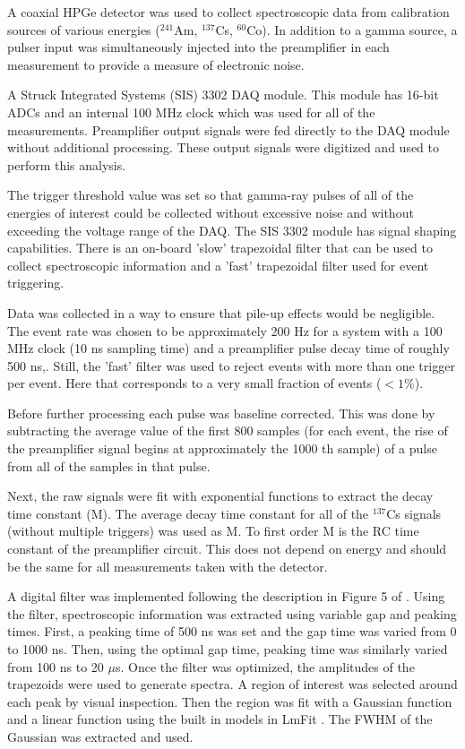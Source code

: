 A coaxial HPGe detector was used to collect spectroscopic data from calibration sources of various energies (${}^{241}$Am, ${}^{137}$Cs, ${}^{60}$Co). In addition to a gamma source, a pulser input was simultaneously injected into the preamplifier in each measurement to provide a measure of electronic noise. 

A Struck Integrated Systems (SIS) 3302 DAQ module. This module has 16-bit ADCs and an internal 100 MHz clock which was used for all of the measurements. Preamplifier output signals were fed directly to the DAQ module without additional processing. These output signals were digitized and used to perform this analysis.

The trigger threshold value was set so that gamma-ray pulses of all of the energies of interest could be collected without excessive noise and without exceeding the voltage range of the DAQ. The SIS 3302 module has signal shaping capabilities. There is an on-board 'slow' trapezoidal filter that can be used to collect spectroscopic information and a 'fast' trapezoidal filter used for event triggering. 

Data was collected in a way to ensure that pile-up effects would be negligible. The event rate was chosen to be approximately 200 Hz for a system with a 100 MHz clock (10 ns sampling time) and a preamplifier pulse decay time of roughly 500 ns,. Still, the 'fast' filter was used to reject events with more than one trigger per event. Here that corresponds to a very small fraction of events ($<1\%$). 

Before further processing each pulse was baseline corrected. This was done by subtracting the average value of the first 800 samples (for each event, the rise of the preamplifier signal begins at approximately the 1000 th sample) of a pulse from all of the samples in that pulse.

Next, the raw signals were fit with exponential functions to extract the decay time constant (M). The average decay time constant for all of the ${}^{137}$Cs signals (without multiple triggers) was used as M. To first order M is the RC time constant of the preamplifier circuit. This does not depend on energy and should be the same for all measurements taken with the detector.

A digital filter was implemented following the description in Figure 5 of \cite{Jordanov}. Using the filter, spectroscopic information was extracted using variable gap and peaking times. First, a peaking time of 500 ns was set and the gap time was varied from 0 to 1000 ns. Then, using the optimal gap time, peaking time was similarly varied from 100 ns to 20 $\mu$s. Once the filter was optimized, the amplitudes of the trapezoids were used to generate spectra. A region of interest was selected around each peak by visual inspection. Then the region was fit with a Gaussian function and a linear function using the built in models in LmFit \cite{LMFIT}. The FWHM of the Gaussian was extracted and used. 

